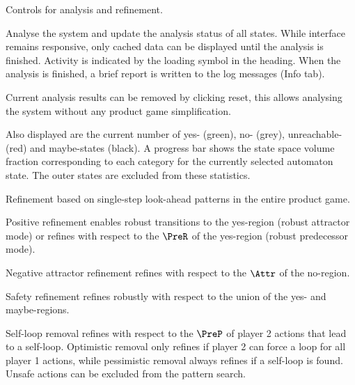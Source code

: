     Controls for analysis and refinement.

    \startsubsubject[title={Widget: Analysis}]

        Analyse the system and update the analysis status of all states.
        While interface remains responsive, only cached data can be displayed until the analysis is finished.
        Activity is indicated by the loading symbol in the heading.
        When the analysis is finished, a brief report is written to the log messages (Info tab).

        Current analysis results can be removed by clicking reset, this allows analysing the system without any product game simplification.

        Also displayed are the current number of yes- (green), no- (grey), unreachable- (red) and maybe-states (black).
        A progress bar shows the state space volume fraction corresponding to each category for the currently selected automaton state.
        The outer states are excluded from these statistics.

    \stopsubsubject

    \startsubsubject[title={Widget: Holistic Refinement}]

        Refinement based on single-step look-ahead patterns in the entire product game.

        \startitemize[packed]
            \item{Positive refinement enables robust transitions to the yes-region (robust attractor mode) or refines with respect to the $\PreR$ of the yes-region (robust predecessor mode).}
            \item{Negative attractor refinement refines with respect to the $\Attr$ of the no-region.}
            \item{Safety refinement refines robustly with respect to the union of the yes- and maybe-regions.}
            \item{
                Self-loop removal refines with respect to the $\PreP$ of player 2 actions that lead to a self-loop.
                Optimistic removal only refines if player 2 can force a loop for all player 1 actions, while pessimistic removal always refines if a self-loop is found.
                Unsafe actions can be excluded from the pattern search.
            }
        \stopitemize

    \stopsubsubject

    \startsubsubject[title={Widget: Robust Transition Refinement}]

